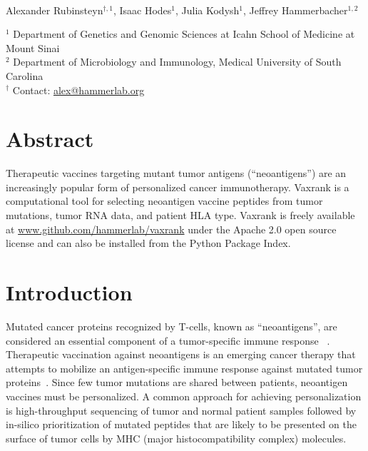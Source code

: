 \documentclass[10pt,letterpaper]{article}
\begin{document}
\vspace*{0.35in}

\begin{flushleft}
{\Large
\textbf{}
}
\newline
\\
Alexander Rubinsteyn$^{\dagger,1}$,
Isaac Hodes$^1$,
Julia Kodysh$^1$,
Jeffrey Hammerbacher$^{1,2}$
\\
\bigskip

    $^1$ Department of Genetics and Genomic Sciences at Icahn School of Medicine at Mount Sinai \\
    $^2$ Department of Microbiology and Immunology, Medical University of South Carolina \\
    $^\dagger$ Contact: \href{alex@hammerlab.org}{alex@hammerlab.org} \\


\end{flushleft}

\section*{Abstract}
    Therapeutic vaccines targeting mutant tumor antigens (``neoantigens'') are an increasingly popular form of personalized cancer immunotherapy. Vaxrank is a computational tool for selecting neoantigen vaccine peptides from tumor mutations, tumor RNA data, and patient HLA type.  Vaxrank is freely available at \href{https://www.github.com/hammerlab/vaxrank}{www.github.com/hammerlab/vaxrank} under the Apache  2.0 open source license and can also be installed from the Python Package Index.



\section{Introduction}


Mutated cancer proteins recognized by T-cells, known as ``neoantigens'', are considered an essential component of a tumor-specific immune response ~\citep{neoantigens-finnigan, neoantigens-schumacher, neoantigens-gubin}. Therapeutic vaccination against neoantigens is an emerging cancer therapy that attempts to mobilize an antigen-specific immune response against mutated tumor proteins~\citep{neovax-sharma, neovax-sahin}. Since few tumor mutations are shared between patients, neoantigen vaccines must be personalized. A common approach for achieving personalization is high-throughput sequencing of tumor and normal patient samples followed by in-silico prioritization of mutated peptides that are likely to be presented on the surface of tumor cells by MHC (major histocompatibility complex) molecules.
\end{document}
